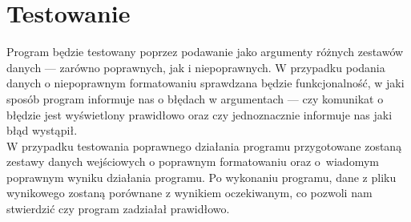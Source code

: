 \documentclass[12pt,a4paper]{article}
\begin{document}
\section{Testowanie}
Program będzie testowany poprzez podawanie jako argumenty różnych zestawów danych --- zarówno poprawnych, jak i niepoprawnych. W przypadku podania danych o niepoprawnym formatowaniu sprawdzana będzie funkcjonalność, w jaki sposób program informuje nas o błędach w argumentach --- czy komunikat o błędzie jest wyświetlony prawidłowo oraz czy jednoznacznie informuje nas jaki błąd wystąpił.\\
\indent W przypadku testowania poprawnego działania programu przygotowane zostaną zestawy danych wejściowych o poprawnym formatowaniu oraz o~wiadomym poprawnym wyniku działania programu. Po wykonaniu programu, dane z pliku wynikowego zostaną porównane z wynikiem oczekiwanym, co pozwoli nam stwierdzić czy program zadziałał prawidłowo.
\end{document}
